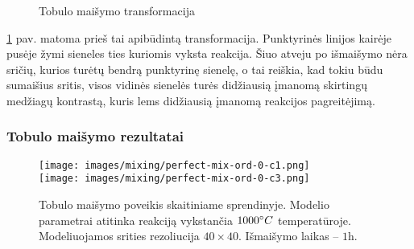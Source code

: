 \begin{figure}[!h]
\centering
{}
\caption{Tobulo maišymo transformacija}
\label{perfect-2x2-mix}
\end{figure}
\ref{perfect-2x2-mix} pav. matoma prieš tai apibūdintą transformacija. Punktyrinės linijos kairėje pusėje žymi sieneles ties kuriomis vyksta reakcija. Šiuo atveju po išmaišymo nėra sričių, kurios turėtų bendrą punktyrinę sienelę, o tai reiškia, kad tokiu būdu sumaišius sritis, visos vidinės sienelės turės didžiausią įmanomą skirtingų medžiagų kontrastą, kuris lems didžiausią įmanomą reakcijos pagreitėjimą.

\subsubsection*{Tobulo maišymo rezultatai}

\begin{figure}[h!]
  \centering
  \texttt{[image: images/mixing/perfect-mix-ord-0-c1.png]} \\ 
  \texttt{[image: images/mixing/perfect-mix-ord-0-c3.png]}
  \caption{Tobulo maišymo poveikis skaitiniame sprendinyje. Modelio parametrai atitinka reakciją vykstančia $1000\degree C$ temperatūroje. Modeliuojamos srities rezoliucija $40\times40$. Išmaišymo laikas -- $1\text{h}. $}
  \label{fig:perfect-mix-small-example}
\end{figure}

